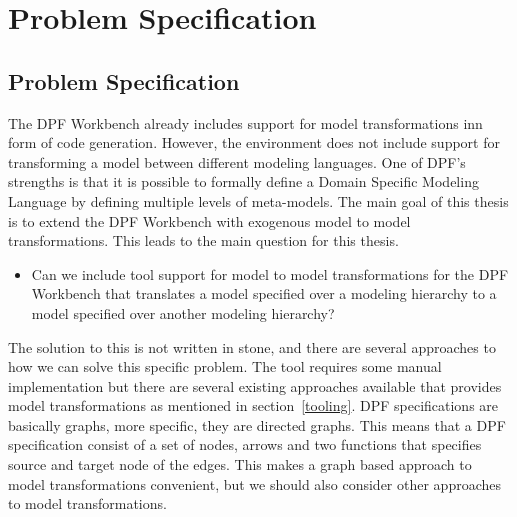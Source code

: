
\chapter{Problem Specification} %

\label{Chapter4} %



\section{Problem Specification}
\label{problem}

The DPF Workbench already includes support for model transformations inn form
of code generation. However, the environment does not include support for
transforming a model between different modeling languages. One of DPF's
strengths is that it is possible to formally define a Domain Specific Modeling
Language by defining multiple levels of meta-models. The main goal of this
thesis is to extend the DPF Workbench with exogenous model to model
transformations. This leads to the main question for this thesis.
 
\begin{itemize}
  
  \item Can we include tool support for model to model transformations for the
  DPF Workbench that translates a model specified over a modeling hierarchy to a
  model specified over another modeling hierarchy?

\end{itemize}

The solution to this is not written in stone, and there are several approaches
to how we can solve this specific problem. The tool requires some manual
implementation but there are several existing approaches available that provides model
transformations as mentioned in section~\ref{tooling}. DPF specifications are
basically graphs, more specific, they are directed graphs. This means that a
DPF specification consist of a set of nodes, arrows and two functions
that specifies source and target node of the edges. This makes a graph based
approach to model transformations convenient, but we should also consider other
approaches to model transformations.

